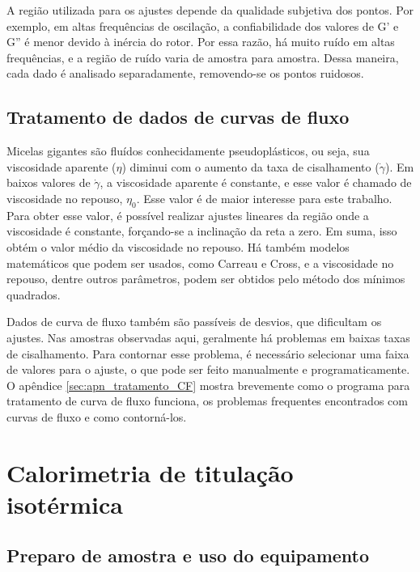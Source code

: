 		A região utilizada para os ajustes depende da qualidade subjetiva dos pontos. Por exemplo, em altas frequências de oscilação, a confiabilidade dos valores de G' e G'' é menor devido à inércia do rotor. Por essa razão, há muito ruído em altas frequências, e a região de ruído varia de amostra para amostra. Dessa maneira, cada dado é analisado separadamente, removendo-se os pontos ruidosos.
		
		\section{Tratamento de dados de curvas de fluxo}
		
		Micelas gigantes são fluídos conhecidamente pseudoplásticos, ou seja, sua viscosidade aparente ($\eta$) diminui com o aumento da taxa de cisalhamento ($\dot{\gamma}$). Em baixos valores de $\dot{\gamma}$, a viscosidade aparente é constante, e esse valor é chamado de viscosidade no repouso, $\eta_0$. Esse valor é de maior interesse para este trabalho. Para obter esse valor, é possível realizar ajustes lineares da região onde a viscosidade é constante, forçando-se a inclinação da reta a zero. Em suma, isso obtém o valor médio da viscosidade no repouso. Há também modelos matemáticos que podem ser usados, como Carreau e Cross, e a viscosidade no repouso, dentre outros parâmetros, podem ser obtidos pelo método dos mínimos quadrados.
		
		Dados de curva de fluxo também são passíveis de desvios, que dificultam os ajustes. Nas amostras observadas aqui, geralmente há problemas em baixas taxas de cisalhamento. Para contornar esse problema, é necessário selecionar uma faixa de valores para o ajuste, o que pode ser feito manualmente e programaticamente. O apêndice \ref{sec:apn_tratamento_CF} mostra brevemente como o programa para tratamento de curva de fluxo funciona, os problemas frequentes encontrados com curvas de fluxo e como contorná-los.
		
	\chapter{Calorimetria de titulação isotérmica}
		\section{Preparo de amostra e uso do equipamento}
		\label{sec:preparo_amostra_itc}
		
